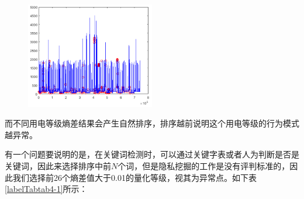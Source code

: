 \documentclass[10.5pt,twocolumn]{jbuaa}
\begin{document}

\begin{figure}[htbp]
\centering
\includegraphics [width=0.5\textwidth]{./image/tu4-3.png}
\end{figure}

而不同用电等级熵差结果会产生自然排序，排序越前说明这个用电等级的行为模式越异常。

有一个问题要说明的是，在关键词检测时，可以通过关键字表或者人为判断是否是关键词，因此来选择排序中前$N$个词，但是隐私挖掘的工作是没有评判标准的，因此我们选择前26个熵差值大于0.01的量化等级，视其为异常点。如下表\ref{labelTabtab4-1}所示：
\end{document}
